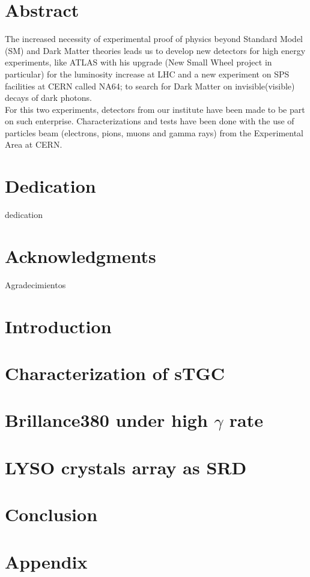 \documentclass[12pt, a4letter,openright,twoside]{book}
\begin{document}

\chapter*{Abstract}
	The increased necessity of experimental proof of physics beyond Standard Model (SM) and Dark Matter theories leads us
	to develop new detectors for high energy experiments, like ATLAS with his upgrade (New Small Wheel project in
	particular) for the luminosity increase at LHC and a new experiment on SPS facilities at CERN called NA64; to search
	for Dark Matter on invisible(visible) decays of dark photons.\\ 
	For this two experiments, detectors from our institute have been made to be part on such enterprise.  Characterizations and tests have been done with the use of particles beam (electrons, pions, muons and gamma rays) from the Experimental Area at CERN.\par


\chapter*{Dedication}
dedication
\chapter*{Acknowledgments}
Agradecimientos
\tableofcontents

\chapter{Introduction}


\chapter{Characterization of sTGC}


\chapter{Brillance380 under high $\gamma$ rate}


\chapter{LYSO crystals array as SRD}


\chapter{Conclusion}


\appendix
\chapter{Appendix}

\end{document}
